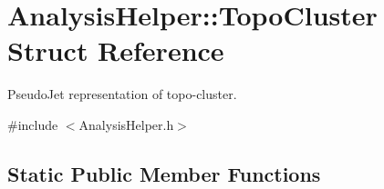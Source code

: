 \hypertarget{structAnalysisHelper_1_1TopoCluster}{}\section{Analysis\+Helper\+:\+:Topo\+Cluster Struct Reference}
\label{structAnalysisHelper_1_1TopoCluster}


Pseudo\+Jet representation of topo-\/cluster.  




{\ttfamily \#include $<$Analysis\+Helper.\+h$>$}

\subsection*{Static Public Member Functions}
